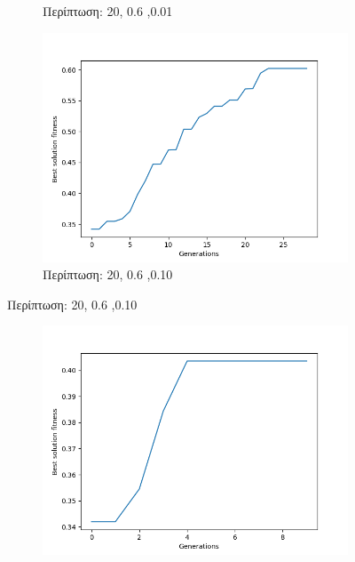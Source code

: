 \documentclass[12pt,a4paper]{article}
\begin{document}
\begin{enumerate}
\begin{figure}[H]
\begin{subfigure}[h]{0.7\textwidth}
                         \caption*{Περίπτωση: 20, 0.6 ,0.01}
                     \end{subfigure}
                     \hfill
                     \begin{subfigure}[h]{0.7\textwidth}
                         \centering
                         \includegraphics[width=\textwidth]{images/3.png}
                         \caption*{Περίπτωση: 20, 0.6 ,0.10}
                     \end{subfigure}
                 \end{figure}
                 \begin{figure}[H]
                     \centering
                     \begin{subfigure}[h]{0.7\textwidth}
                         \centering
                         \includegraphics[width=\textwidth]{images/4.png}

\end{subfigure}
\end{figure}
\end{enumerate}
\end{document}
